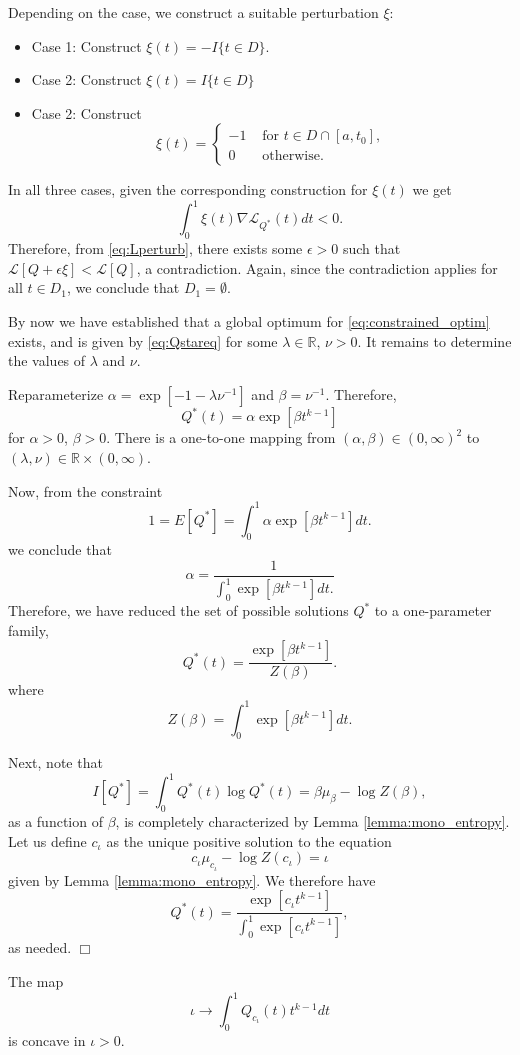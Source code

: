 Depending on the case, we construct a suitable perturbation $\xi$:
\begin{itemize}
\item Case 1: Construct $\xi(t) = -I\{t \in D\}$.
\item Case 2: Construct $\xi(t) = I\{t \in D\}$
\item Case 2: Construct
\[
\xi(t) = \begin{cases}
-1 & \text{ for }t \in D \cap [a, t_0],\\
0 & \text{ otherwise. }
\end{cases}
\]
\end{itemize}
In all three cases, given the corresponding construction for $\xi(t)$ we get
\[
\int_0^1 \xi(t) \nabla \mathcal{L}_{Q^*}(t) dt < 0.
\]
Therefore, from \eqref{eq:Lperturb}, there exists some $\epsilon > 0$
such that $\mathcal{L}[Q + \epsilon \xi] < \mathcal{L}[Q]$, a
contradiction.  Again, since the contradiction applies for all $t \in
D_1$, we conclude that $D_1 = \emptyset$.

By now we have established that a global optimum
for \eqref{eq:constrained_optim} exists, and is given
by \eqref{eq:Qstareq} for some $\lambda \in \mathbb{R}$, $\nu > 0$.  It remains
to determine the values of $\lambda$ and $\nu$.

Reparameterize $\alpha = \exp[-1-\lambda\nu^{-1}]$ and $\beta = \nu^{-1}$.
Therefore,
\[
Q^*(t) = \alpha \exp[\beta t^{k-1}]
\]
for $\alpha > 0$, $\beta > 0$.  There is a one-to-one mapping from
$(\alpha, \beta) \in (0, \infty)^2$ to $(\lambda, \nu) \in
\mathbb{R} \times (0,\infty)$.

Now, from the constraint
\[
1 = E[Q^*] = \int_0^1 \alpha \exp[\beta t^{k-1}] dt.
\]
we conclude that
\[
\alpha = \frac{1}{\int_0^1 \exp[\beta t^{k-1}] dt.}
\]
Therefore, we have reduced the set of possible solutions $Q^*$ to a one-parameter family,
\[
Q^*(t) = \frac{\exp[\beta t^{k-1}]}{Z(\beta)}.
\]
where
\[
Z(\beta) = \int_0^1 \exp[\beta t^{k-1}] dt.
\]

Next, note that
\[
I[Q^*] = \int_0^1 Q^*(t) \log Q^*(t) = \beta \mu_\beta - \log Z(\beta),
\]
as a function of $\beta$, is completely characterized by Lemma \ref{lemma:mono_entropy}.
Let us define $c_\iota$ as the unique positive solution to the equation
\[
c_\iota \mu_{c_\iota} - \log Z(c_\iota) = \iota
\]
given by Lemma \ref{lemma:mono_entropy}.
We therefore have
\[
Q^*(t) = \frac{\exp[c_\iota t^{k-1}]}{\int_0^1 \exp[c_\iota t^{k-1}]},
\]
as needed. $\Box$


\begin{lemma}\label{lemma:concave}
The map
\[
\iota \to \int_0^1 Q_{c_\iota}(t) t^{k-1} dt
\]
is concave in $\iota > 0$.
\end{lemma}

